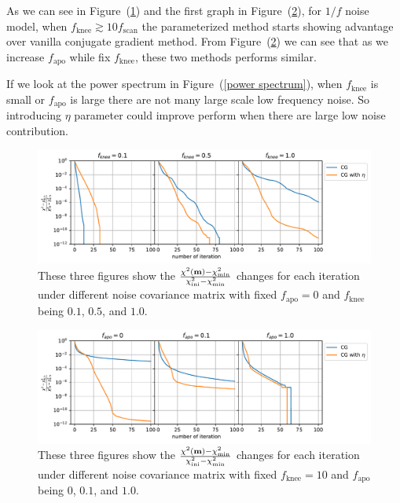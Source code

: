 \documentclass[twocolumn,linenumbers]{aastex631}
\newcommand{\vbm}{\vb{m}}
\begin{document}
As we can see in Figure~(\ref{1/f noise chi2}) and the first graph in 
Figure~(\ref{apo noise chi2}),
for $1/f$ noise model, when $f_\text{knee} \gtrsim 10 f_\text{scan}$
the parameterized method starts showing advantage over vanilla conjugate gradient method.
From Figure~(\ref{apo noise chi2}) we can see that as we increase $f_\text{apo}$
while fix $f_\text{knee}$, these two methods performs similar.

If we look at the power spectrum in Figure~(\ref{power spectrum}),
when $f_\text{knee}$ is small or $f_\text{apo}$ is large there are not many
large scale low frequency noise.
So introducing $\eta$ parameter could improve perform when there are large low noise
contribution.


\begin{figure}[htb!]
\centering
\includegraphics[width=\textwidth]{pink_noise_chi2.pdf}
\caption{These three figures show the 
$\frac{\chi^2(\vbm) - \chi^2_\text{min}}{\chi^2_\text{ini} - \chi^2_\text{min}}$
changes for each iteration under different noise covariance matrix with
fixed $f_\text{apo}=0$ and $f_\text{knee}$ being $0.1$, $0.5$, and $1.0$.
}
\label{1/f noise chi2}
\end{figure}

\begin{figure}[htb!]
\centering
\includegraphics[width=\textwidth]{apodized_noise_chi2.pdf}
\caption{These three figures show the 
$\frac{\chi^2(\vbm) - \chi^2_\text{min}}{\chi^2_\text{ini} - \chi^2_\text{min}}$
changes for each iteration under different noise covariance matrix with
fixed $f_\text{knee}=10$ and $f_\text{apo}$ being $0$, $0.1$, and $1.0$.
}
\label{apo noise chi2}
\end{figure}
\end{document}
